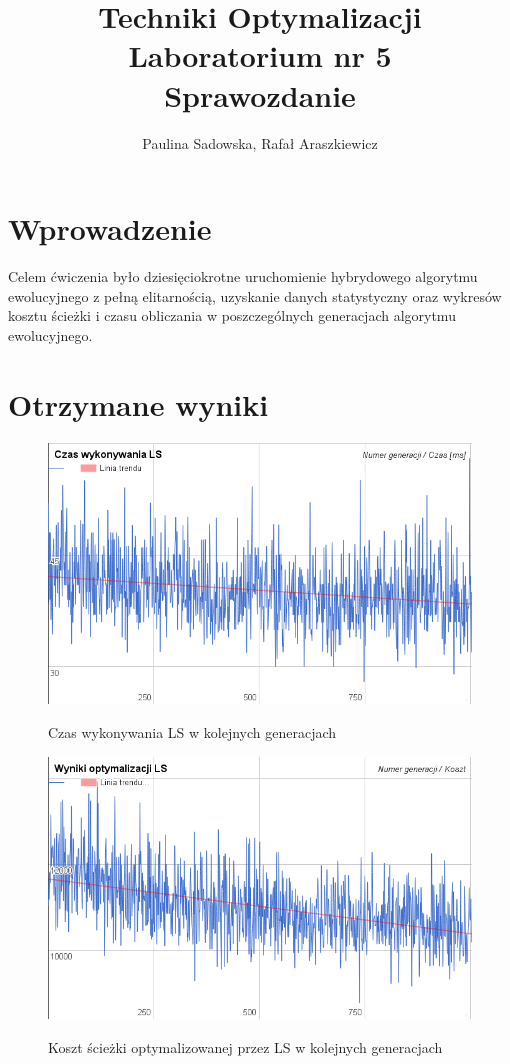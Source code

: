 \documentclass[a4paper 10pt]{article}
\title{\textbf{Techniki Optymalizacji} \\
Laboratorium nr 5 \\
Sprawozdanie}
\author{Paulina Sadowska, Rafał Araszkiewicz}
\begin{document}
\maketitle

\section{Wprowadzenie}
Celem ćwiczenia było dziesięciokrotne uruchomienie hybrydowego algorytmu ewolucyjnego z pełną elitarnością, uzyskanie danych statystyczny oraz wykresów kosztu ścieżki i czasu obliczania w poszczególnych generacjach algorytmu ewolucyjnego.

\section{Otrzymane wyniki}


\begin{figure} [H]
\centering
\caption{Czas wykonywania LS w kolejnych generacjach}
\includegraphics[angle=0,width = 1\textwidth, height=!]{images/czas_ls.png}
\label{Rys. Edges}
\end{figure}

\begin{figure} [H]
\centering
\caption{Koszt ścieżki optymalizowanej przez LS w kolejnych generacjach}
\includegraphics[angle=0,width = 1\textwidth, height=!]{images/wyniki_opti.png}
\label{Rys. Node}
\end{figure}
\end{document}
